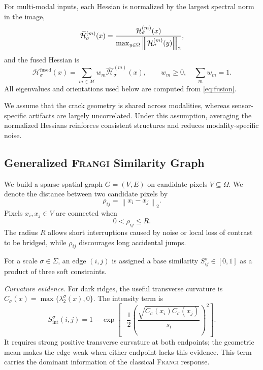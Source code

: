 \documentclass[conference,a4paper]{IEEEtran}
\newcommand{\norme}[1]{\left\lVert #1 \right\rVert}
\newcommand{\Frangi}{\textnormal{\textsc{Frangi}}}
\newcommand{\Hess}{\mathcal{H}}
\newcommand{\matnorm}[1]{\left\lvert\mkern-2mu\left\lvert\mkern-2mu\left\lvert #1 \right\rvert\mkern-2mu\right\rvert\mkern-2mu\right\rvert}
\begin{document}
For multi-modal inputs, each Hessian is normalized by the largest spectral norm \cite{Horn2012Matrix} in the image,
\begin{equation}
    \widehat{\Hess}_{\sigma}^{(m)}(x)
    =
    \frac{\Hess_{\sigma}^{(m)}(x)}{
    \max_{y\in\Omega}\matnorm{\Hess_{\sigma}^{(m)}(y)}_2},
\end{equation}
and the fused Hessian is
\begin{equation}
    \Hess_{\sigma}^{\mathrm{fused}}(x)=
    \sum_{m\in\mathcal M}w_m\widehat{\Hess}_{\sigma}^{(m)}(x),
    \qquad w_m\ge0,\quad \sum_m w_m=1.
\label{eq:fusion}
\end{equation}
All eigenvalues and orientations used below are computed from \eqref{eq:fusion}. 


We assume that the crack geometry is shared across modalities, whereas sensor-specific artifacts are largely uncorrelated. Under this assumption, averaging the normalized Hessians reinforces consistent structures and reduces modality-specific noise.


\subsection{Generalized \Frangi{} Similarity Graph}
We build a sparse spatial graph $G=(V,E)$ on candidate pixels $ V \subseteq \Omega$. We denote the distance between two candidate pixels by
\begin{equation}
    \rho_{ij}=\norme{x_i-x_j}_2.
\label{eq:spatial_distance}
\end{equation}
Pixels $x_i,x_j\in V$ are connected when
\begin{equation}
    0<\rho_{ij}\le R.
\end{equation}
The radius $R$ allows short interruptions caused by noise or local loss of contrast to be bridged, while $\rho_{ij}$ discourages long accidental jumps.

For a scale $\sigma\in\Sigma$, an edge $(i,j)$ is assigned a base similarity $S_{ij}^\sigma\in[0,1]$ as a product of three soft constraints.

\emph{Curvature evidence.} For dark ridges, the useful transverse curvature is $C_\sigma(x)=\max\{\lambda_2^\sigma(x),0\}$. The intensity term is
\begin{equation}
S_{\mathrm{int}}^\sigma(i,j)=
1-\exp\left[-\frac12\left(\frac{\sqrt{C_\sigma(x_i)C_\sigma(x_j)}}{s_{\mathrm{i}}}\right)^2\right].
\end{equation}
It requires strong positive transverse curvature at both endpoints; the geometric mean makes the edge weak when either endpoint lacks this evidence. This term carries the dominant information of the classical \Frangi{} response.
\end{document}

